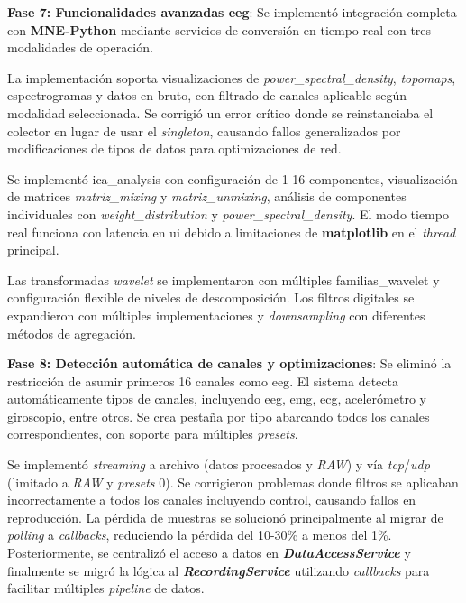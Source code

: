\textbf{Fase 7: Funcionalidades avanzadas \acrshort{eeg}}:
Se implementó integración completa con \textbf{MNE-Python} mediante servicios de conversión en tiempo real con tres modalidades de operación.

La implementación soporta visualizaciones de \textit{\gls{power_spectral_density}}, \textit{\gls{topomaps}}, espectrogramas y datos en bruto, con filtrado de canales aplicable según modalidad seleccionada. Se corrigió un error crítico donde se reinstanciaba el colector en lugar de usar el \textit{singleton}, causando fallos generalizados por modificaciones de tipos de datos para optimizaciones de red.

Se implementó \gls{ica_analysis} con configuración de 1-16 componentes, visualización de matrices \textit{\gls{matriz_mixing}} y \textit{\gls{matriz_unmixing}}, análisis de componentes individuales con \textit{\gls{weight_distribution}} y \textit{\gls{power_spectral_density}}. El modo tiempo real funciona con latencia en \acrshort{ui} debido a limitaciones de \textbf{matplotlib} en el \textit{thread} principal.

Las transformadas \textit{\gls{wavelet}} se implementaron con múltiples \gls{familias_wavelet} y configuración flexible de niveles de descomposición. Los filtros digitales se expandieron con múltiples implementaciones y \textit{\gls{downsampling}} con diferentes métodos de agregación.

\textbf{Fase 8: Detección automática de canales y optimizaciones}:
Se eliminó la restricción de asumir primeros 16 canales como \acrshort{eeg}. El sistema detecta automáticamente tipos de canales, incluyendo \acrshort{eeg}, \acrshort{emg}, \acrshort{ecg}, acelerómetro y giroscopio, entre otros. Se crea pestaña por tipo abarcando todos los canales correspondientes, con soporte para múltiples \textit{\gls{presets}}.

Se implementó \textit{\gls{streaming}} a archivo (datos procesados y \textit{RAW}) y vía \textit{\gls{tcp}}/\textit{\gls{udp}} (limitado a \textit{RAW} y \textit{\gls{presets}} 0). Se corrigieron problemas donde filtros se aplicaban incorrectamente a todos los canales incluyendo control, causando fallos en reproducción. La pérdida de muestras se solucionó principalmente al migrar de \textit{\gls{polling}} a \textit{\glspl{callback}}, reduciendo la pérdida del 10-30\% a menos del 1\%. Posteriormente, se centralizó el acceso a datos en \textit{\textbf{DataAccessService}} y finalmente se migró la lógica al \textit{\textbf{RecordingService}} utilizando \textit{\glspl{callback}} para facilitar múltiples \textit{\gls{pipeline}} de datos.

